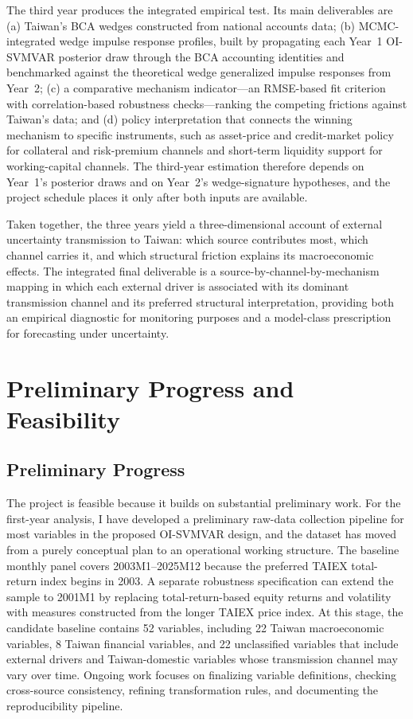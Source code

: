 \documentclass[12pt]{article}
\begin{document}
The third year produces the integrated empirical test. Its main deliverables are (a) Taiwan's BCA wedges constructed from national accounts data; (b) MCMC-integrated wedge impulse response profiles, built by propagating each Year~1 OI-SVMVAR posterior draw through the BCA accounting identities and benchmarked against the theoretical wedge generalized impulse responses from Year~2; (c) a comparative mechanism indicator---an RMSE-based fit criterion with correlation-based robustness checks---ranking the competing frictions against Taiwan's data; and (d) policy interpretation that connects the winning mechanism to specific instruments, such as asset-price and credit-market policy for collateral and risk-premium channels and short-term liquidity support for working-capital channels. The third-year estimation therefore depends on Year~1's posterior draws and on Year~2's wedge-signature hypotheses, and the project schedule places it only after both inputs are available.

Taken together, the three years yield a three-dimensional account of external uncertainty transmission to Taiwan: which source contributes most, which channel carries it, and which structural friction explains its macroeconomic effects. The integrated final deliverable is a source-by-channel-by-mechanism mapping in which each external driver is associated with its dominant transmission channel and its preferred structural interpretation, providing both an empirical diagnostic for monitoring purposes and a model-class prescription for forecasting under uncertainty.

\section{Preliminary Progress and Feasibility}

\subsection{Preliminary Progress}

The project is feasible because it builds on substantial preliminary work. For the first-year analysis, I have developed a preliminary raw-data collection pipeline for most variables in the proposed OI-SVMVAR design, and the dataset has moved from a purely conceptual plan to an operational working structure. The baseline monthly panel covers 2003M1--2025M12 because the preferred TAIEX total-return index begins in 2003. A separate robustness specification can extend the sample to 2001M1 by replacing total-return-based equity returns and volatility with measures constructed from the longer TAIEX price index. At this stage, the candidate baseline contains 52 variables, including 22 Taiwan macroeconomic variables, 8 Taiwan financial variables, and 22 unclassified variables that include external drivers and Taiwan-domestic variables whose transmission channel may vary over time. Ongoing work focuses on finalizing variable definitions, checking cross-source consistency, refining transformation rules, and documenting the reproducibility pipeline.
\end{document}
